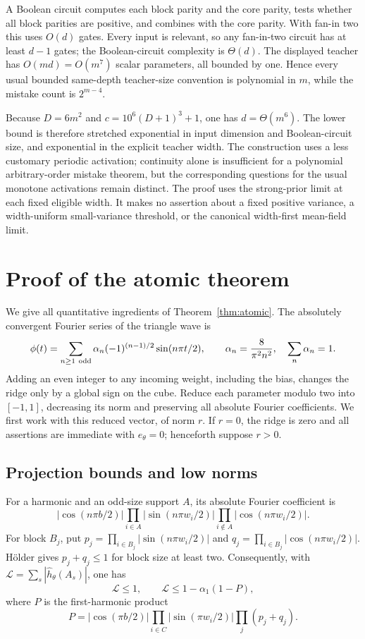 \documentclass[11pt]{article}
\begin{document}
A Boolean circuit computes each block parity and the core parity,
tests whether all block parities are positive, and combines with the
core parity. With fan-in two this uses $O(d)$ gates. Every input is
relevant, so any fan-in-two circuit has at least $d-1$ gates; the
Boolean-circuit complexity is $\Theta(d)$. The displayed teacher has
$O(md)=O(m^7)$ scalar parameters, all bounded by one. Hence every
usual bounded same-depth teacher-size convention is polynomial in
$m$, while the mistake count is $2^{m-4}$.

Because $D=6m^2$ and $c=10^6(D+1)^3+1$, one has $d=\Theta(m^6)$.
The lower bound is therefore stretched exponential in input dimension
and Boolean-circuit size, and exponential in the explicit teacher
width. The construction uses a less customary periodic activation;
continuity alone is insufficient for a polynomial arbitrary-order
mistake theorem, but the corresponding questions for the usual
monotone activations remain distinct. The proof uses the strong-prior
limit at each fixed eligible width. It makes no assertion about a
fixed positive variance, a width-uniform small-variance threshold,
or the canonical width-first mean-field limit.

\appendix
\section{Proof of the atomic theorem}\label{app:atomic}

We give all quantitative ingredients of Theorem~\ref{thm:atomic}.
The absolutely convergent Fourier series of the triangle wave is
\begin{equation}\label{eq:triangleseries}
 \phi(t)=\sum_{n\ge1\ {\rm odd}}\alpha_n
      (-1)^{(n-1)/2}\sin(n\pi t/2),
 \qquad \alpha_n=\frac8{\pi^2n^2},\quad\sum_n\alpha_n=1.
\end{equation}
Adding an even integer to any incoming weight, including the bias,
changes the ridge only by a global sign on the cube. Reduce each
parameter modulo two into $[-1,1]$, decreasing its norm and preserving
all absolute Fourier coefficients. We first work with this reduced
vector, of norm $r$. If $r=0$, the ridge is zero and all assertions
are immediate with $e_\theta=0$; henceforth suppose $r>0$.

\subsection{Projection bounds and low norms}

For a harmonic and an odd-size support $A$, its absolute Fourier
coefficient is
\[
 |\cos(n\pi b/2)|
 \prod_{i\in A}|\sin(n\pi w_i/2)|
 \prod_{i\notin A}|\cos(n\pi w_i/2)|.
\]
For block $B_j$, put
$p_j=\prod_{i\in B_j}|\sin(n\pi w_i/2)|$ and
$q_j=\prod_{i\in B_j}|\cos(n\pi w_i/2)|$.
H\"older gives $p_j+q_j\le1$ for block size at least two.
Consequently, with
$\mathcal L=\sum_s|\widehat h_\theta(A_s)|$, one has
\begin{equation}\label{eq:Lfirstharmonic}
 \mathcal L\le1,\qquad
 \mathcal L\le1-\alpha_1(1-P),
\end{equation}
where $P$ is the first-harmonic product
\[
 P=|\cos(\pi b/2)|\prod_{i\in C}|\sin(\pi w_i/2)|
                         \prod_j(p_j+q_j).
\]
\end{document}
